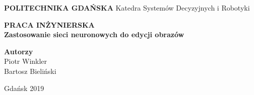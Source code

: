\documentclass[12pt]{article}
\begin{document}
\begin{titlepage}
  \begin{center}

    \vspace*{1cm}
    \Huge
    \textbf{POLITECHNIKA GDAŃSKA}
    \vspace{0.5cm}
    \LARGE
    Katedra Systemów Decyzyjnych i Robotyki

    \vspace{1.5cm}
    \textbf{PRACA INŻYNIERSKA}
    \\[0.5cm]
    \textbf{Zastosowanie sieci neuronowych do edycji obrazów}

    \vspace{2.5cm}
    \Large
    \textbf{Autorzy}\\
    Piotr Winkler\\
    Bartosz Bieliński

    \vspace{3.5cm}
    Gdańsk 2019

  \end{center}
\end{titlepage}

\newpage
  \tableofcontents

\newpage
\end{document}
